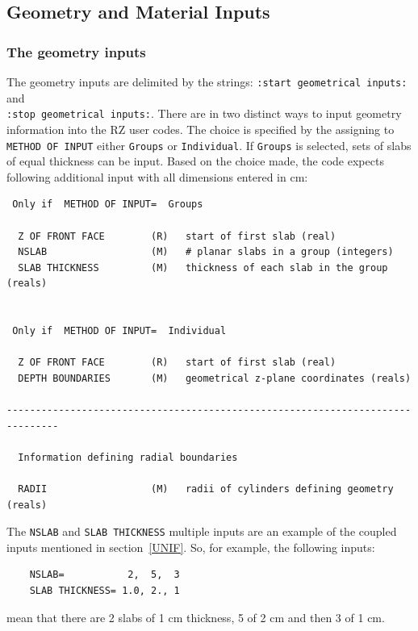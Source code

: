 \documentclass[12pt,twoside]{article}  %
\begin{document}
\subsection{Geometry and Material Inputs}

\subsubsection{The geometry inputs}
\label{geomsect}

 
The geometry inputs are delimited by the strings:
\verb+:start geometrical inputs:+ and \\
\verb+:stop geometrical inputs:+.
There are in two distinct ways to input geometry information into the RZ
user codes. The choice is specified by the assigning to \verb+METHOD OF INPUT+
either \verb+Groups+ or \verb+Individual+. If \verb+Groups+
is selected, sets of slabs of equal thickness can be input.
Based on the choice made, the code expects following additional input
with all dimensions entered in cm:

\begin{verbatim}
 Only if  METHOD OF INPUT=  Groups

  Z OF FRONT FACE        (R)   start of first slab (real)
  NSLAB                  (M)   # planar slabs in a group (integers)
  SLAB THICKNESS         (M)   thickness of each slab in the group (reals)


 Only if  METHOD OF INPUT=  Individual

  Z OF FRONT FACE        (R)   start of first slab (real)
  DEPTH BOUNDARIES       (M)   geometrical z-plane coordinates (reals)

-------------------------------------------------------------------------------

  Information defining radial boundaries

  RADII                  (M)   radii of cylinders defining geometry (reals)

\end{verbatim}
  
 
The {\tt NSLAB} and {\tt SLAB THICKNESS} multiple inputs are an example of
the coupled inputs mentioned in section~\ref{UNIF}.  So, for example, the
following inputs:\\
\begin{verbatim}
    NSLAB=           2,  5,  3
    SLAB THICKNESS= 1.0, 2., 1
\end{verbatim}
mean that there are 2 slabs of 1 cm thickness, 5 of 2 cm and then 3 of 1
cm.
\end{document}
